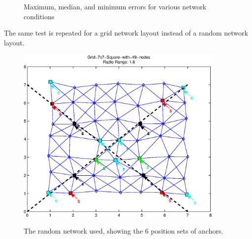 \begin{figure}
    \centerline{
      \hfil
       }
    \caption{Maximum, median, and minimum errors for various network conditions} \label{fig:45DegreeAxisRandomResults}
\end{figure}

The same test is repeated for a grid network layout instead of a random network layout.

\begin{figure}
  \centering
  \includegraphics[width=4in]{results/45DegreeAxis_Grid/network-Grid-7x7-Square-with-49-nodes-Radius1.6.eps}\\
  \caption{The random network used, showing the 6 position sets of anchors.}
  \label{fig:45DegreeAxisGridNetwork}
\end{figure}


